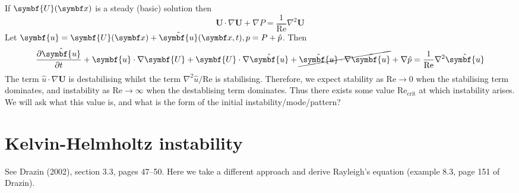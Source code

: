 \documentclass{jknotes}
\renewcommand{\u}{\symbf{u}}
\begin{document}
If $\symbf{U}(\x)$ is a steady (basic) solution then
\begin{equation}
	\symbf{U}\cdot\nabla\symbf{U} + \nabla P = \frac{1}{\text{Re}} \nabla^2
	\symbf{U}
\end{equation}
Let $\u = \symbf{U}(\x) + \hat{\u}(\x,t), p = P + \hat{p}$. Then
\begin{equation}
	\frac{\partial \hat{\u}}{\partial t} + \u \cdot \nabla \symbf{U} +
	\symbf{U} \cdot \nabla \hat{\u} + \cancel{\hat{\u}\cdot\nabla\hat{\u}} +
	\nabla \hat{p} = \frac{1}{\text{Re}} \nabla^2 \hat{\u}
\end{equation}
The term $\hat{u}\cdot\nabla \symbf{U}$ is destabilising whilst the term
$\nabla^2 \hat{u} / \text{Re}$ is stabilising. Therefore, we expect stability
as $\text{Re} \to 0$ when the stabilising term dominates, and instability as
$\text{Re} \to \infty$ when the destablising term dominates. Thus there exists
some value $\text{Re}_{\text{crit}}$ at which instability arises. We will ask
what this value is, and what is the form of the initial
instability/mode/pattern?

\section{Kelvin-Helmholtz instability}
See Drazin (2002), section 3.3, pages 47--50. Here we take a different approach
and derive Rayleigh's equation (example 8.3, page 151 of Drazin). 

\begin{center}
\end{center}
\end{document}

